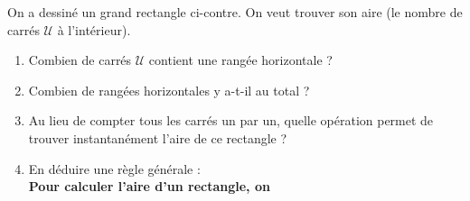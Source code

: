 \documentclass[a4paper]{book}
\begin{document}
   
    \begin{exercice}

        \begin{minipage}{0.5\linewidth}
            On a dessiné un grand rectangle ci-contre. On veut trouver son aire (le nombre de carrés $\mathcal{U}$ à l'intérieur).
        \end{minipage}
        \hfill
        \begin{minipage}{0.49\linewidth}
            \begin{center}
            \end{center}
        \end{minipage}
        
        \begin{enumerate}
            \item Combien de carrés $\mathcal{U}$ contient une rangée horizontale ? \points[2]
            \item Combien de rangées horizontales y a-t-il au total ? \points[2]
            \item Au lieu de compter tous les carrés un par un, quelle opération permet de trouver instantanément l'aire de ce rectangle ? \newline
            \item En déduire une règle générale : \\
            \textbf{Pour calculer l'aire d'un rectangle, on } \points[10]
        \end{enumerate}
    \end{exercice}
    
\end{document}
